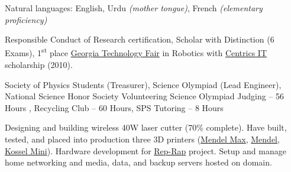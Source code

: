 \documentclass[10pt,a4paper]{article}
\begin{document}
\vspace{0.5em}
\inlineheadsection
  {Natural languages:}
  {English, Urdu \emph{(mother tongue)}, French \emph{(elementary proficiency)}}

\spacedhrule{1.6em}{-0.4em}

  {\href{https://www.citiprogram.org/}{} Responsible Conduct of Research certification,  Scholar with Distinction (6 Exams), 1\textsuperscript{st} place \href{http://www.gatechfair.org/}{Georgia Technology Fair} in Robotics with \href{http://www.centricsit.com/}{Centrics IT} scholarship (2010).}
  
	{Society of Physics Students (Treasurer), Science Olympiad (Lead Engineer), National Science Honor Society}
	    \vspace{0.5em}
  \inlineheadsection
  {Volunteering}
  {Science Olympiad Judging -- 56 Hours , Recycling Club -- 60 Hours, SPS Tutoring -- 8 Hours}

{Designing and building wireless 40W laser cutter (70\% complete). Have built, tested, and placed into production three 3D printers (\href{http://reprap.org/wiki/MendelMax}{Mendel Max}, \href{http://reprap.org/wiki/Mendel}{Mendel}, \href{http://reprap.org/wiki/Kossel}{Kossel Mini}). Hardware development for \href{http://reprap.org/wiki/RepRap}{Rep-Rap} project. Setup and manage home networking and media, data, and backup servers hosted on domain.}
\end{document}
